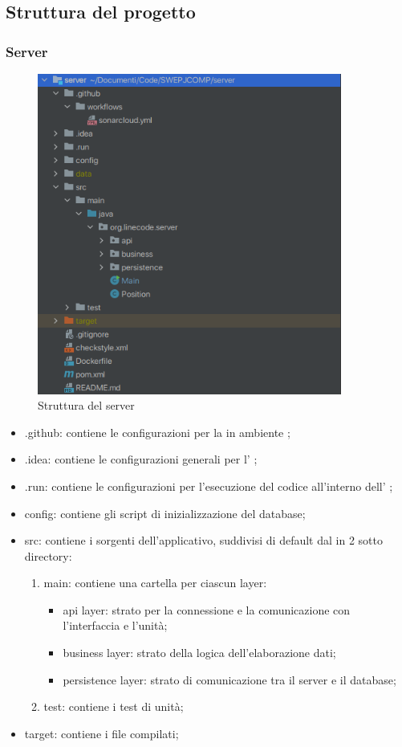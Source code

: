 \subsection{Struttura del progetto}
	\subsubsection{Server}
	
	\begin{figure}[H]
		\centering
		\includegraphics[width=10cm]{img/struttura_server.png}
		\caption{Struttura del server}
	\end{figure}

	\begin{itemize}
		\item{.github}: contiene le configurazioni per la  in ambiente ;
		\item{.idea}: contiene le configurazioni generali per l' ;
		\item{.run}: contiene le configurazioni per l'esecuzione del codice all'interno	dell' ;
		\item{config}: contiene gli script di inizializzazione del database;
		\item{src}: contiene i sorgenti dell'applicativo, suddivisi di default dal  in 2 sotto	directory:
		\begin{enumerate}
			\item{main}: contiene una cartella per ciascun layer:
				\begin{itemize}
					\item{api layer}: strato per la connessione e la comunicazione con l'interfaccia e l'unità;
					\item{business layer}: strato della logica dell'elaborazione dati;
					\item{persistence layer}: strato di comunicazione tra il server e il database;
				\end{itemize}
			\item{test}: contiene i test di unità;
		\end{enumerate}
		\item{target}: contiene i file compilati;
	\end{itemize}

